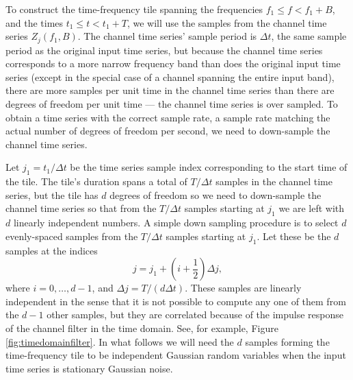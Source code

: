 \documentclass{article}
\begin{document}
To construct the time-frequency tile spanning the frequencies \(f_{1} \leq
f < f_{1} + B\), and the times \(t_{1} \leq t < t_{1} + T\), we will use
the samples from the channel time series \(Z_{j}(f_{1}, B)\).  The channel
time series' sample period is \(\Delta t\), the same sample period as the
original input time series, but because the channel time series corresponds
to a more narrow frequency band than does the original input time series
(except in the special case of a channel spanning the entire input band),
there are more samples per unit time in the channel time series than there
are degrees of freedom per unit time --- the channel time series is over
sampled.  To obtain a time series with the correct sample rate, a sample
rate matching the actual number of degrees of freedom per second, we need
to down-sample the channel time series.

Let \(j_{1} = t_{1} / \Delta t\) be the time series sample index
corresponding to the start time of the tile.  The tile's duration spans a
total of \(T / \Delta t\) samples in the channel time series, but the tile
has \(d\) degrees of freedom so we need to down-sample the channel time
series so that from the \(T / \Delta t\) samples starting at \(j_{1}\) we
are left with \(d\) linearly independent numbers.  A simple down sampling
procedure is to select \(d\) evenly-spaced samples from the \(T / \Delta
t\) samples starting at \(j_{1}\).  Let these be the \(d\) samples at the
indices
\begin{equation}
\label{eqn8}
j
   = j_{1} + (i + \frac{1}{2}) \Delta j,
\end{equation}
where \(i = 0, \ldots, d - 1\), and \(\Delta j = T / (d \Delta t)\).  These
samples are linearly independent in the sense that it is not possible to
compute any one of them from the \(d - 1\) other samples, but they are
correlated because of the impulse response of the channel filter in the
time domain.  See, for example, Figure \ref{fig:timedomainfilter}.  In what
follows we will need the \(d\) samples forming the time-frequency tile to
be independent Gaussian random variables when the input time series is
stationary Gaussian noise.
\end{document}
